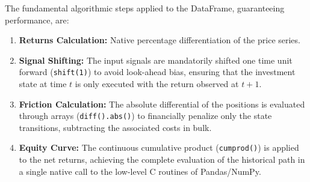 The fundamental algorithmic steps applied to the DataFrame, guaranteeing performance, are:
\begin{enumerate}
    \item \textbf{Returns Calculation:} Native percentage differentiation of the price series.
    \item \textbf{Signal Shifting:} The input signals are mandatorily shifted one time unit forward (\texttt{shift(1)}) to avoid look-ahead bias, ensuring that the investment state at time \(t\) is only executed with the return observed at \(t+1\).
    \item \textbf{Friction Calculation:} The absolute differential of the positions is evaluated through arrays (\texttt{diff().abs()}) to financially penalize only the state transitions, subtracting the associated costs in bulk.
    \item \textbf{Equity Curve:} The continuous cumulative product (\texttt{cumprod()}) is applied to the net returns, achieving the complete evaluation of the historical path in a single native call to the low-level C routines of Pandas/NumPy.
\end{enumerate}
